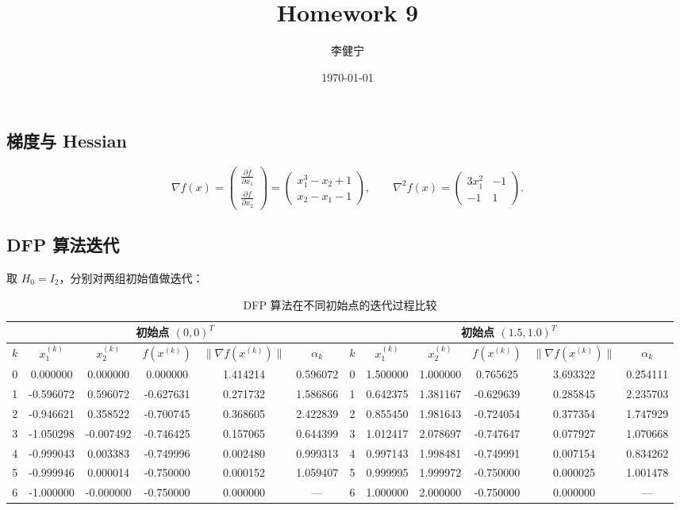 \documentclass{homework}
\author{李健宁}
\date{\today}
\title{Homework 9}
\begin{document}
 \maketitle

\question

\begin{sol}
\subsection*{梯度与 Hessian}
\[
\nabla f(x)
=\begin{pmatrix}
\frac{\partial f}{\partial x_1}\\[6pt]
\frac{\partial f}{\partial x_2}
\end{pmatrix}
=\begin{pmatrix}
x_1^3 - x_2 + 1\\[4pt]
x_2 - x_1 - 1
\end{pmatrix}, 
\qquad
\nabla^2 f(x)
=\begin{pmatrix}
3x_1^2 & -1\\
-1 & 1
\end{pmatrix}.
\]

\subsection*{DFP 算法迭代}
取 $H_0=I_2$，分别对两组初始值做迭代：
\begin{table}[ht]
\centering
\caption{DFP 算法在不同初始点的迭代过程比较}
\label{tab:dfp_compare}
\begin{tabular}{c c c c c c | c c c c c c}
\toprule
\multicolumn{6}{c|}{初始点 $(0,0)^T$} & \multicolumn{6}{c}{初始点 $(1.5,1.0)^T$} \\
\midrule
$k$ & $x_1^{(k)}$ & $x_2^{(k)}$ & $f(x^{(k)})$ & $\|\nabla f(x^{(k)})\|$ & $\alpha_k$ 
& $k$ & $x_1^{(k)}$ & $x_2^{(k)}$ & $f(x^{(k)})$ & $\|\nabla f(x^{(k)})\|$ & $\alpha_k$ \\
\midrule
0 &  0.000000 &  0.000000 &  0.000000 & 1.414214 & 0.596072 
& 0 &  1.500000 & 1.000000 &  0.765625 & 3.693322 & 0.254111 \\
1 & -0.596072 &  0.596072 & -0.627631 & 0.271732 & 1.586866 
& 1 &  0.642375 & 1.381167 & -0.629639 & 0.285845 & 2.235703 \\
2 & -0.946621 &  0.358522 & -0.700745 & 0.368605 & 2.422839 
& 2 &  0.855450 & 1.981643 & -0.724054 & 0.377354 & 1.747929 \\
3 & -1.050298 & -0.007492 & -0.746425 & 0.157065 & 0.644399 
& 3 &  1.012417 & 2.078697 & -0.747647 & 0.077927 & 1.070668 \\
4 & -0.999043 &  0.003383 & -0.749996 & 0.002480 & 0.999313 
& 4 &  0.997143 & 1.998481 & -0.749991 & 0.007154 & 0.834262 \\
5 & -0.999946 &  0.000014 & -0.750000 & 0.000152 & 1.059407 
& 5 &  0.999995 & 1.999972 & -0.750000 & 0.000025 & 1.001478 \\
6 & -1.000000 & -0.000000 & -0.750000 & 0.000000 & —        
& 6 &  1.000000 & 2.000000 & -0.750000 & 0.000000 & —        \\
\bottomrule
\end{tabular}
\end{table}


\end{sol}
\end{document}
